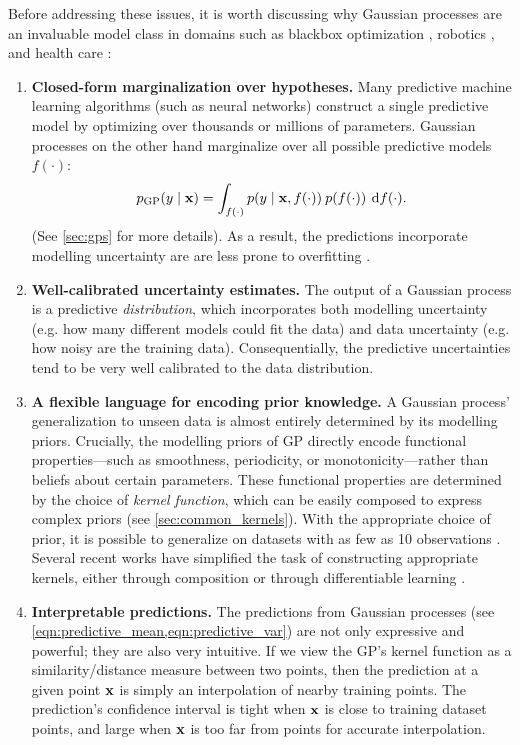 Before addressing these issues, it is worth discussing why Gaussian processes are an invaluable model class in domains such as blackbox optimization \cite{snoek2012practical}, robotics \cite{deisenroth2011pilco}, and health care \cite{schulam2015framework}:
\begin{enumerate}
  \item {\bf Closed-form marginalization over hypotheses.}
    Many predictive machine learning algorithms (such as neural networks) construct a single predictive model by optimizing over thousands or millions of parameters.
    Gaussian processes on the other hand marginalize over all possible predictive models $f(\cdot)$:
    \[
      p_\text{GP} ( y \mid \mathbf{x} ) = \int_{f(\cdot)} p( y \mid \mathbf{x}, f(\cdot)) \: p(f(\cdot)) \: \,\mathrm{d}{f}(\cdot).
    \]
    (See \cref{sec:gps} for more details).
    As a result, the predictions incorporate modelling uncertainty are are less prone to overfitting \cite{rasmussen2006gaussian}.

  \item {\bf Well-calibrated uncertainty estimates.}
    The output of a Gaussian process is a predictive \emph{distribution}, which incorporates both modelling uncertainty (e.g. how many different models could fit the data) and data uncertainty (e.g. how noisy are the training data).
    Consequentially, the predictive uncertainties tend to be very well calibrated to the data distribution.

  \item {\bf A flexible language for encoding prior knowledge.}
    A Gaussian process' generalization to unseen data is almost entirely determined by its modelling priors.
    Crucially, the modelling priors of GP directly encode functional properties---such as smoothness, periodicity, or monotonicity---rather than beliefs about certain parameters.
    These functional properties are determined by the choice of \emph{kernel function}, which can be easily composed to express complex priors (see \cref{sec:common_kernels}).
    With the appropriate choice of prior, it is possible to generalize on datasets with as few as 10 observations \citep[e.g.]{rasmussen2006gaussian,gardner2017discovering}.
    Several recent works have simplified the task of constructing appropriate kernels, either through composition \citep{duvenaud2013structure} or through differentiable learning \citep{wilson2013gaussian}.

  \item {\bf Interpretable predictions.}
    The predictions from Gaussian processes (see \cref{eqn:predictive_mean,eqn:predictive_var}) are not only expressive and powerful; they are also very intuitive.
    If we view the GP's kernel function as a similarity/distance measure between two points, then the prediction at a given point $\mathbf{x}$ is simply an interpolation of nearby training points.
    The prediction's confidence interval is tight when $\mathbf{x}$ is close to training dataset points, and large when $\mathbf{x}$ is too far from points for accurate interpolation.
\end{enumerate}

